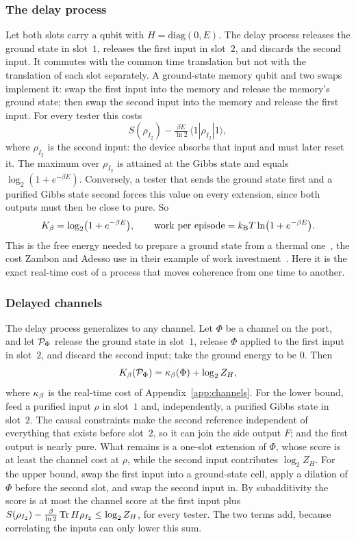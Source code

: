 \subsubsection{The delay process}

Let both slots carry a qubit with $H=\mathrm{diag}(0,E)$. The delay process releases the ground state in slot~$1$, releases the first input in slot~$2$, and discards the second input. It commutes with the common time translation but not with the translation of each slot separately. A ground-state memory qubit and two swaps implement it: swap the first input into the memory and release the memory's ground state; then swap the second input into the memory and release the first input. For every tester this costs
\[
S(\rho_{I_2})-\tfrac{\beta E}{\ln2}\,\langle1|\rho_{I_2}|1\rangle,
\]
where $\rho_{I_2}$ is the second input: the device absorbs that input and must later reset it. The maximum over $\rho_{I_2}$ is attained at the Gibbs state and equals $\log_2(1+e^{-\beta E})$. Conversely, a tester that sends the ground state first and a purified Gibbs state second forces this value on every extension, since both outputs must then be close to pure. So
\[
K_\beta=\log_2\bigl(1+e^{-\beta E}\bigr),\qquad\text{work per episode}=k_{\mathrm B} T\ln\bigl(1+e^{-\beta E}\bigr).
\]
This is the free energy needed to prepare a ground state from a thermal one~\cite{HorodeckiOppenheim13,Brandao13}, the cost Zambon and Adesso use in their example of work investment~\cite{ZambonAdesso}. Here it is the exact real-time cost of a process that moves coherence from one time to another.

\subsubsection{Delayed channels}

The delay process generalizes to any channel. Let $\Phi$ be a channel on the port, and let $\mathcal P_\Phi$ release the ground state in slot~$1$, release $\Phi$ applied to the first input in slot~$2$, and discard the second input; take the ground energy to be $0$. Then
\[
K_\beta(\mathcal P_\Phi)=\kappa_\beta(\Phi)+\log_2Z_H,
\]
where $\kappa_\beta$ is the real-time cost of Appendix~\ref{app:channels}. For the lower bound, feed a purified input $\rho$ in slot~$1$ and, independently, a purified Gibbs state in slot~$2$. The causal constraints make the second reference independent of everything that exists before slot~$2$, so it can join the side output $F$; and the first output is nearly pure. What remains is a one-slot extension of $\Phi$, whose score is at least the channel cost at $\rho$, while the second input contributes $\log_2Z_H$. For the upper bound, swap the first input into a ground-state cell, apply a dilation of $\Phi$ before the second slot, and swap the second input in. By subadditivity the score is at most the channel score at the first input plus $S(\rho_{I_2})-\frac{\beta}{\ln2}\operatorname{Tr} H\rho_{I_2}\le\log_2Z_H$, for every tester. The two terms add, because correlating the inputs can only lower this sum.

